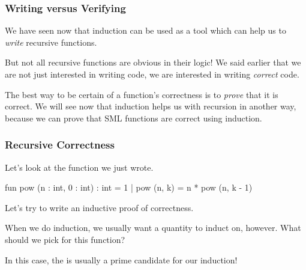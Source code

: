 \documentclass[aspectratio=169]{beamer}
\begin{document}
\begin{frame}[fragile]
  \frametitle{Writing versus Verifying} 

  We have seen now that induction can be used as a tool which can help us to
  \textit{write} recursive functions.

  \pause
  \vspace{\fill}

  But not all recursive functions are obvious in their logic! We said earlier
  that we are not just interested in writing code, we are interested in writing
  \textit{correct} code.

  \pause
  \vspace{\fill}

  The best way to be certain of a function's correctness is to \textit{prove}
  that it is correct. We will see now that induction helps us with recursion
  in another way, because we can prove that SML functions are correct using
  induction.

\end{frame}


\begin{frame}[fragile]
  \frametitle{Recursive Correctness}

  Let's look at the  function we just wrote.

  \vspace{\fill}

  \begin{codeblock}
    fun pow (n : int, 0 : int) : int = 1 
      | pow (n, k) = n * pow (n, k - 1) 
  \end{codeblock}

  \pause
  \vspace{\fill}

  Let's try to write an inductive proof of correctness.

  \pause
  \vspace{\fill}

  When we do induction, we usually want a quantity to induct on, however.
  What should we pick for this function?

  \pause
  \vspace{\fill}

  In this case, the  is usually a prime
  candidate for our induction!
\end{frame}
\end{document}
